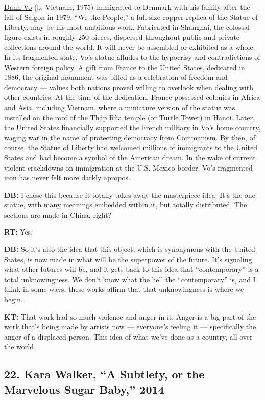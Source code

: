 \href{https://www.publicartfund.org/exhibitions/view/danh-vo-we-the-people/}{Danh
Vo} (b. Vietnam, 1975) immigrated to Denmark with his family after the
fall of Saigon in 1979. ``We the People,'' a full-size copper replica of
the Statue of Liberty, may be his most ambitious work. Fabricated in
Shanghai, the colossal figure exists in roughly 250 pieces, dispersed
throughout public and private collections around the world. It will
never be assembled or exhibited as a whole. In its fragmented state,
Vo's statue alludes to the hypocrisy and contradictions of Western
foreign policy. A gift from France to the United States, dedicated in
1886, the original monument was billed as a celebration of freedom and
democracy --- values both nations proved willing to overlook when
dealing with other countries. At the time of the dedication, France
possessed colonies in Africa and Asia, including Vietnam, where a
miniature version of the statue was installed on the roof of the Tháp
Rùa temple (or Turtle Tower) in Hanoi. Later, the United States
financially supported the French military in Vo's home country, waging
war in the name of protecting democracy from Communism. By then, of
course, the Statue of Liberty had welcomed millions of immigrants to the
United States and had become a symbol of the American dream. In the wake
of current violent crackdowns on immigration at the U.S.-Mexico border,
Vo's fragmented icon has never felt more darkly apropos.

\textbf{DB:} I chose this because it totally takes away the masterpiece
idea. It's the one statue, with many meanings embedded within it, but
totally distributed. The sections are made in China, right?

\textbf{RT:} Yes.

\textbf{DB:} So it's also the idea that this object, which is synonymous
with the United States, is now made in what will be the superpower of
the future. It's signaling what other futures will be, and it gets back
to this idea that ``contemporary'' is a total unknowingness. We don't
know what the hell the ``contemporary'' is, and I think in some ways,
these works affirm that that unknowingness is where we begin.

\textbf{KT:} That work had so much violence and anger in it. Anger is a
big part of the work that's being made by artists now --- everyone's
feeling it --- specifically the anger of a displaced person. This idea
of what we've done as a country, all over the world.

\hypertarget{22-kara-walker-a-subtlety-or-the-marvelous-sugar-baby-2014}{%
\subsection{22. Kara Walker, ``A Subtlety, or the Marvelous Sugar
Baby,''
2014}\label{22-kara-walker-a-subtlety-or-the-marvelous-sugar-baby-2014}}

